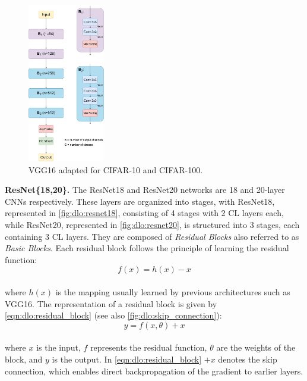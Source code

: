 \begin{figure}[htbp]
  \centering
  \includegraphics[width=0.30\textwidth]{chapter_dlo/assets/vgg16_cifar.pdf}
  \caption{VGG16 adapted for CIFAR-10 and CIFAR-100.}
  \label{fig:dlo:vgg16_cifar}
\end{figure}

\noindent \textbf{ResNet\{18,20\}.} The ResNet18 and ResNet20 networks
\cite{DBLP:conf/cvpr/HeZRS16} are 18 and 20-layer \acp{CNN} respectively. These
layers are organized into stages, with ResNet18, represented in
\cref{fig:dlo:resnet18}, consisting of 4 stages with 2 \ac{CL} layers each,
while ResNet20, represented in \cref{fig:dlo:resnet20}, is structured into 3
stages, each containing 3 \ac{CL} layers. They are composed of \emph{Residual
Blocks} also referred to as \emph{Basic Blocks}. Each residual block follows the
principle of learning the residual function:\\

\begin{equation}
  f(x) = h(x) - x
\end{equation} \\

\noindent where $h(x)$ is the mapping usually learned by previous architectures
such as VGG16. The representation of a residual block is given by
\cref{eqn:dlo:residual_block} (see also \cref{fig:dlo:skip_connection}): \\

\begin{equation}
  \label{eqn:dlo:residual_block}
  y = f(x,\theta) + x
\end{equation}\\

\noindent where $x$ is the input, $f$ represents the residual function, $\theta$
are the weights of the block, and $y$ is the output. In
\cref{eqn:dlo:residual_block} $+ x$ denotes the skip connection, which enables
direct backpropagation of the gradient to earlier layers.\\

